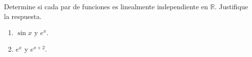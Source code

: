Determine si cada par de funciones es linealmente independiente en $\mathbb R$. Justifique la respuesta.

\begin{enumerate}[label=(\alph*),ref=\alph*,leftmargin=*]
\item $\sin x$ y $e^x$.
\item $e^x$ y $e^{x+2}$.
\end{enumerate}
